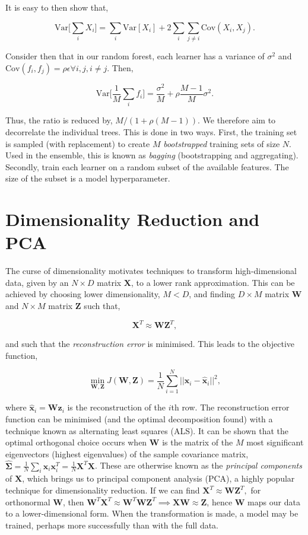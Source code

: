 \documentclass[11pt]{amsart}
\begin{document}
It is easy to then show that,

$$\text{Var}\Big[\sum_i X_i\Big] = \sum_i \text{Var}[X_i] + 2\sum_i\sum_{j \neq i} \text{Cov}(X_i, X_j).$$

Consider then that in our random forest, each learner has a variance of $\sigma^2$ and $\text{Cov}(f_i, f_j) = \rho\epsilon \forall i, j, i \neq j$. Then,

$$\text{Var}\Big[\frac{1}{M}\sum_i f_i\Big] = \frac{\sigma^2}{M} + \rho\frac{M-1}{M}\sigma^2.$$

Thus, the ratio is reduced by, $M/(1 + \rho(M-1))$. We therefore aim to decorrelate the individual trees. This is done in two ways. First, the training set is sampled (with replacement) to create $M$ \emph{bootstrapped} training sets of size $N$. Used in the ensemble, this is known as \emph{bagging} (bootstrapping and aggregating). Secondly, train each learner on a random subset of the available features. The size of the subset is a model hyperparameter.

\section{Dimensionality Reduction and PCA}

The curse of dimensionality motivates techniques to transform high-dimensional data, given by an $N \times D$ matrix $\mathbf{X}$, to a lower rank approximation. This can be achieved by choosing lower dimensionality, $M  < D$, and finding $D \times M$ matrix $\mathbf{W}$ and $N \times M$ matrix $\mathbf{Z}$ such that,

$$\mathbf{X}^T \approx \mathbf{W}\mathbf{Z}^T,$$

and such that the \emph{reconstruction error} is minimised. This leads to the objective function,

$$\min_{\mathbf{W}, \mathbf{Z}} J(\mathbf{W}, \mathbf{Z}) = \frac{1}{N}\sum_{i=1}^N||\mathbf{x}_i - \hat{\mathbf{x}}_i||^2,$$

where $\hat{\mathbf{x}}_i = \mathbf{W}\mathbf{z}_i$ is the reconstruction of the $i$th row. The reconstruction error function can be minimised (and the optimal decomposition found) with a technique known as alternating least squares (ALS). It can be shown that the optimal orthogonal choice occurs when $\mathbf{W}$ is the matrix of the $M$ most significant eigenvectors (highest eigenvalues) of the sample covariance matrix, $\hat{\boldsymbol\Sigma} = \frac{1}{N}\sum_i\mathbf{x}_i\mathbf{x}_i^T = \frac{1}{N}\mathbf{X}^T\mathbf{X}$. These are otherwise known as the \emph{principal components} of $\mathbf{X}$, which brings us to principal component analysis (PCA), a highly popular technique for dimensionality reduction. If we can find $\mathbf{X}^T \approx \mathbf{W}\mathbf{Z}^T,$ for orthonormal $\mathbf{W}$, then $\mathbf{W}^T\mathbf{X}^T \approx \mathbf{W}^T\mathbf{W}\mathbf{Z}^T \implies \mathbf{X}\mathbf{W}  \approx \mathbf{Z}$, hence $\mathbf{W}$ maps our data to a lower-dimensional form. When the transformation is made, a model may be trained, perhaps more successfully than with the full data.
\end{document}
